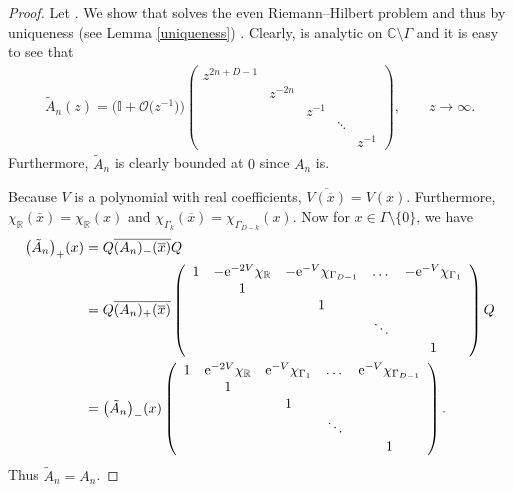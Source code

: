\documentclass[pdftex]{sigma}
\numberwithin{equation}{section}
\begin{document}
\begin{proof}
Let . We show that  solves the even Riemann--Hilbert problem and thus by uniqueness (see Lemma \ref{uniqueness}) . Clearly,  is analytic on $\mathbb{C}\setminus \Gamma$ and it is easy to see that
\begin{align*}
\tilde{A}_{n}(z) = \big(\mathbb{I}+ \mathcal{O}\big(z^{-1}\big)\big) \left(\begin{matrix}
z^{2n+D-1} \\
& z^{-2n} \\
& & z^{-1} \\
& & & \ddots \\
& & & & z^{-1}
\end{matrix} \right),\qquad z \to \infty.
\end{align*}
Furthermore, $\tilde{A}_{n}$ is clearly bounded at $0$ since $A_{n}$ is.

Because $V$ is a polynomial with real coefficients, $\overline{V(\overline{x})} = V(x)$. Furthermore, $\chi_\mathbb{R}(\overline{x}) = \chi_\mathbb{R}(x)$ and $\chi_{\Gamma_k}(\overline{x}) = \chi_{\Gamma_{D-k}}(x)$. Now for $x \in \Gamma \setminus \{ 0 \}$, we have
\begin{align*}
\big(\tilde{A}_{n} \big)_+(x) &= Q \overline{( A_{n})_- (\overline{x})} Q \\
&= Q \overline{( A_{n})_+ (\overline{x})} \left(\begin{array}{ccccccccccccccccccc}
1 & -{\rm e}^{-2V} \chi_\mathbb{R} & -{\rm e}^{-V} \chi_{\Gamma_{D-1}} & \dots & -{\rm e}^{-V} \chi_{\Gamma_{1}} \\
& 1 \\
& & 1 \\
& & & \ddots \\
& & & & 1 \\
\end{array} \right) Q \\
&=\big(\tilde{A}_{n} \big)_-(x)\left(\begin{array}{ccccccccccccccccccc}
1 & {\rm e}^{-2V} \chi_\mathbb{R} & {\rm e}^{-V} \chi_{\Gamma_{1}} & \dots & {\rm e}^{-V} \chi_{\Gamma_{D-1}} \\
& 1 \\
& & 1 \\
& & & \ddots \\
& & & & 1 \\
\end{array} \right).
\end{align*}
Thus $\tilde{A}_{n} = A_{n}$.
\end{proof}
\end{document}
